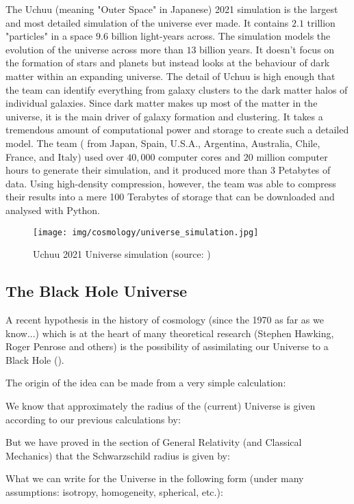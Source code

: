 	The Uchuu (meaning "Outer Space" in Japanese) 2021 simulation is the largest and most detailed simulation of the universe ever made. It contains $2.1$ trillion "particles" in a space $9.6$ billion light-years across. The simulation models the evolution of the universe across more than $13$ billion years. It doesn't focus on the formation of stars and planets but instead looks at the behaviour of dark matter within an expanding universe. The detail of Uchuu is high enough that the team can identify everything from galaxy clusters to the dark matter halos of individual galaxies. Since dark matter makes up most of the matter in the universe, it is the main driver of galaxy formation and clustering. It takes a tremendous amount of computational power and storage to create such a detailed model. The team ( from Japan, Spain, U.S.A., Argentina, Australia, Chile, France, and Italy) used over $40,000$ computer cores and $20$ million computer hours to generate their simulation, and it produced more than $3$ Petabytes of data. Using high-density compression, however, the team was able to compress their results into a mere 100 Terabytes of storage that can be downloaded and analysed with Python.
	\begin{figure}[H]
		\centering
		\texttt{[image: img/cosmology/universe\_simulation.jpg]}
		\caption[Uchuu 2021 Universe simulation]{Uchuu 2021 Universe simulation (source: \cite{ishiyama2021uchuu})}
	\end{figure}
	
	\pagebreak
	\subsection{The Black Hole Universe}
	A recent hypothesis in the history of cosmology (since the 1970 as far as we know...) which is at the heart of many theoretical research (Stephen Hawking, Roger Penrose and others) is the possibility of assimilating our Universe to a Black Hole ().

	The origin of the idea can be made from a very simple calculation:

	We know that approximately the radius of the (current) Universe is given according to our previous calculations by:
	
	But we have proved in the section of General Relativity (and Classical Mechanics) that the Schwarzschild radius is given by:
	
	What we can write for the Universe in the following form (under many assumptions: isotropy, homogeneity, spherical, etc.):
	
